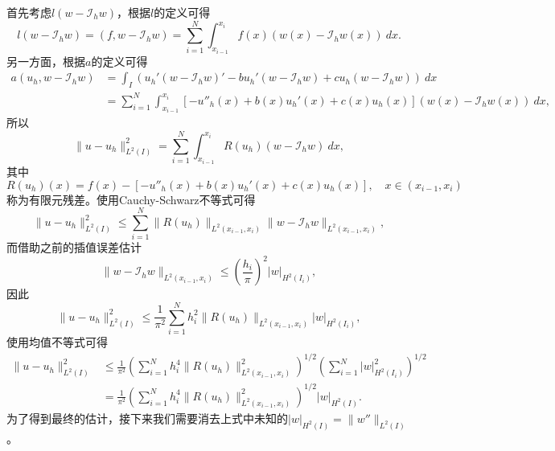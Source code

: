 \documentclass[a4paper,10pt]{ctexart}
\begin{document}
首先考虑$ l(w-\mathcal{I}_h w) $，根据$ l $的定义可得
\[
    l(w-\mathcal{I}_h w) = (f,w-\mathcal{I}_h w) = \sum_{i=1}^{N}\int_{x_{i-1}}^{x_i} f(x)(w(x)-\mathcal{I}_h w(x))\ dx.
\]
另一方面，根据$ a $的定义可得
\[
    \begin{aligned}
        a(u_h,w-\mathcal{I}_h w) 
        &= \int_I (u_h'(w-\mathcal{I}_h w)'-bu_h'(w-\mathcal{I}_h w)+cu_h(w-\mathcal{I}_h w))\ dx\\
        &= \sum_{i=1}^{N}\int_{x_{i-1}}^{x_i} [-u''_h(x)+b(x)u_h'(x)+c(x)u_h(x)](w(x)-\mathcal{I}_h w(x))\ dx,
    \end{aligned}
\]
所以
\begin{equation}
    \| u - u_h \|_{L^2(I)}^2 = \sum_{i=1}^{N}\int_{x_{i-1}}^{x_i} R(u_h)(w-\mathcal{I}_hw)\ dx,
\end{equation}
其中
\begin{equation}
    R(u_h)(x) = f(x) - [-u''_h(x)+b(x)u_h'(x)+c(x)u_h(x)],\quad x\in (x_{i-1},x_i)
\end{equation}
称为有限元残差。使用Cauchy-Schwarz不等式可得
\[
    \| u - u_h \|_{L^2(I)}^2 \leqslant \sum_{i=1}^{N}\| R(u_h) \|_{L^2(x_{i-1},x_i)}\| w-\mathcal{I}_h w \|_{L^2(x_{i-1},x_i)},
\]
而借助之前的插值误差估计
\[
    \| w-\mathcal{I}_h w \|_{L^2(x_{i-1},x_i)} \leqslant \left( \frac{h_i}{\pi} \right)^2  | w |_{H^2(I_i)},
\]
因此
\begin{equation}
    \| u - u_h \|^2_{L^2(I)} \leqslant \frac{1}{\pi^2}\sum_{i=1}^{N}h_i^2 \| R(u_h) \|_{L^2(x_{i-1},x_i)}| w |_{H^2(I_i)},
\end{equation}
使用均值不等式可得
\begin{equation}
    \begin{aligned}
        \| u - u_h \|^2_{L^2(I)} 
        &\leqslant \frac{1}{\pi^2}\left( \sum_{i=1}^{N}h_i^4 \| R(u_h) \|_{L^2(x_{i-1},x_i)}^2 \right)^{1 / 2}\left( \sum_{i=1}^{N} | w |_{H^2(I_i)}^2 \right)^{1 / 2} \\
        &= \frac{1}{\pi^2}\left( \sum_{i=1}^{N}h_i^4 \| R(u_h) \|_{L^2(x_{i-1},x_i)}^2 \right)^{1 / 2}| w |_{H^2(I)}.
    \end{aligned}
\end{equation}
为了得到最终的估计，接下来我们需要消去上式中未知的$ | w |_{H^2(I)} = \| w'' \|_{L^2(I)} $。
\end{document}
